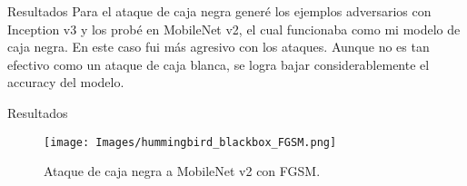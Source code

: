 \documentclass[10pt]{beamer}
\begin{document}
\begin{frame}{Resultados}
\justify	
\small
Para el ataque de caja negra generé los ejemplos adversarios con Inception v3 y los probé en MobileNet v2, el cual funcionaba como mi modelo de caja negra. En este caso fui más agresivo con los ataques. Aunque no es tan efectivo como un ataque de caja blanca, se logra bajar considerablemente el accuracy del modelo. 
%
\begin{table}[H]
\centering
{}
\caption{Ataque de caja negra a MobileNet v2.}
\end{table}

\end{frame}

\begin{frame}{Resultados}
\justify	
\small

\begin{figure}[H]
\centering
\texttt{[image: Images/hummingbird\_blackbox\_FGSM.png]}
\caption{Ataque de caja negra a MobileNet v2 con FGSM.}
\end{figure}

\end{frame}
\end{document}
